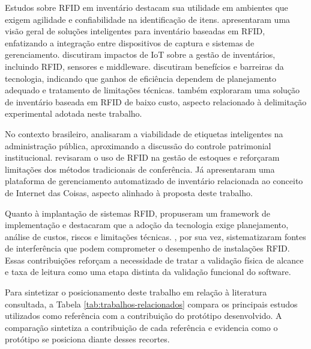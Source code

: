 Estudos sobre RFID em inventário destacam sua utilidade em ambientes que exigem agilidade e confiabilidade na identificação de itens.  apresentaram uma visão geral de soluções inteligentes para inventário baseadas em RFID, enfatizando a integração entre dispositivos de captura e sistemas de gerenciamento.  discutiram impactos de IoT sobre a gestão de inventários, incluindo RFID, sensores e middleware.  discutiram benefícios e barreiras da tecnologia, indicando que ganhos de eficiência dependem de planejamento adequado e tratamento de limitações técnicas.  também exploraram uma solução de inventário baseada em RFID de baixo custo, aspecto relacionado à delimitação experimental adotada neste trabalho.

No contexto brasileiro,  analisaram a viabilidade de etiquetas inteligentes na administração pública, aproximando a discussão do controle patrimonial institucional.  revisaram o uso de RFID na gestão de estoques e reforçaram limitações dos métodos tradicionais de conferência. Já  apresentaram uma plataforma de gerenciamento automatizado de inventário relacionada ao conceito de Internet das Coisas, aspecto alinhado à proposta deste trabalho.

Quanto à implantação de sistemas RFID,  propuseram um framework de implementação e destacaram que a adoção da tecnologia exige planejamento, análise de custos, riscos e limitações técnicas. , por sua vez, sistematizaram fontes de interferência que podem comprometer o desempenho de instalações RFID. Essas contribuições reforçam a necessidade de tratar a validação física de alcance e taxa de leitura como uma etapa distinta da validação funcional do software.

Para sintetizar o posicionamento deste trabalho em relação à literatura consultada, a Tabela \ref{tab:trabalhos-relacionados} compara os principais estudos utilizados como referência com a contribuição do protótipo desenvolvido. A comparação sintetiza a contribuição de cada referência e evidencia como o protótipo se posiciona diante desses recortes.

